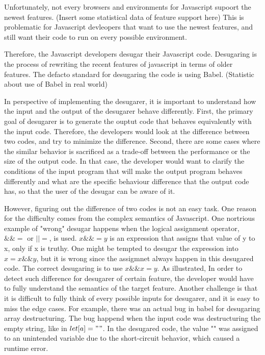 Unfortunately, not every browsers and environments for Javascript supoort the newest features.
(Insert some statistical data of feature support here)
This is problematic for Javascript devleopers that want to use the newest features,
and still want their code to run on every possible environment.

Therefore, the Javascript developers desugar their Javascript code.
Desugaring is the process of rewriting the recent features of javascript in terms of older features.
The defacto standard for desugaring the code is using Babel.
(Statistic about use of Babel in real world)

In perspective of implementing the desugarer, it is important to understand how the input and the output of the desugarer behave differently.
First, the primary goal of desugarer is to generate the ouptut code that behaves equivalently with the input code.
Therefore, the developers would look at the difference between two codes, and try to minimize the difference.
Second, there are some cases where the similar behavior is sacrificed as a trade-off between the performance or the size of the output code.
In that case, the developer would want to clarify the conditions of the input program that will make the output program behaves differently
and what are the specific behaviour difference that the output code has,
so that the user of the desugar can be aware of it.

However, figuring out the difference of two codes is not an easy task.
One reason for the difficulty comes from the complex semantics of Javascript.
One nortrious example of "wrong" desugar happens when the logical assignment operator, $\&\&=$ or $\vert\vert=$, is used.
$x \&\&= y$ is an expression that assigns that value of y to x, only if x is truthy.
One might be tempted to desugar the expression into $x = x \&\& y$, but it is wrong since the assigmnet always happen in this desugared code.
The correct desugaring is to use $x \&\& x = y$. As illustrated, In order to detect such difference for desugarer of certain feature,
the developer would have to fully understand the semantics of the target feature. Another challenge is that it is difficult to fully
think of every possible inputs for desugarer, and it is easy to miss the edge cases.
For example, there was an actual bug in babel for desugaring array destructuring. The bug happend when the input code was
destructuring the empty string, like in $let [a] = ""$. In the desugared code, the value "" was assigned to an unintended
variable due to the short-circuit behavior, which caused a runtime error. 

